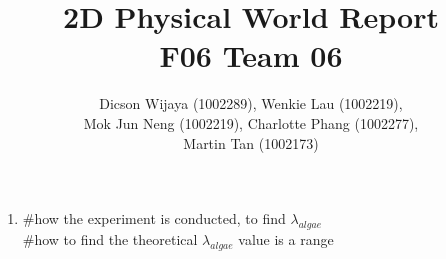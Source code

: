 \documentclass[12pt,a4paper]{article}
\author{Dicson Wijaya (1002289), Wenkie Lau (1002219), \\ Mok Jun Neng (1002219), Charlotte Phang (1002277), \\ Martin Tan (1002173)}
\title{2D Physical World Report\\ F06 Team 06}
\begin{document}
	
	\maketitle
	
	\begin{enumerate}[label=\Alph*]
		\begin{figure}[H]
			\begin{center}
				\texttt{[image: setup.png]}
				\caption{}
				\label{fig:setup}
			\end{center}
		\end{figure}
    	\item
    	\#how the experiment is conducted, to find $\lambda_{algae}$ \\
    	
    	\#how to find the theoretical $\lambda_{algae}$ value is a range \\
    	

\end{enumerate}
\end{document}

